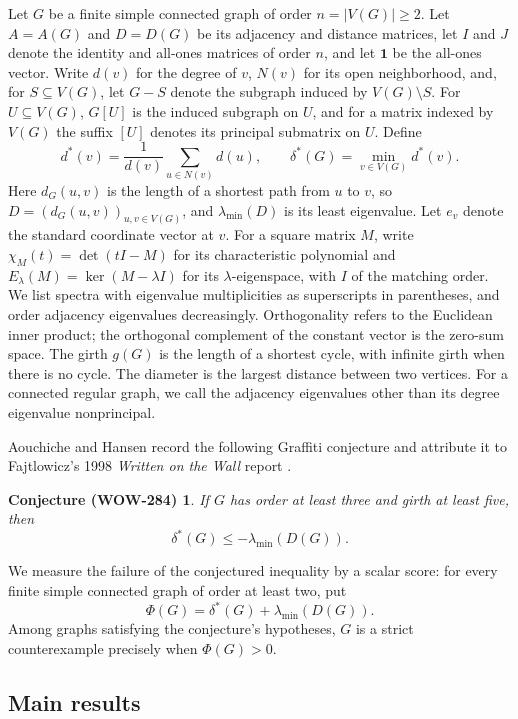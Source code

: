 \documentclass[a4paper,10pt,reqno]{amsart}
\theoremstyle{plain}
\newtheorem*{wowconjecture}{Conjecture (WOW-284)}
\theoremstyle{definition}
\theoremstyle{remark}
\newcommand{\one}{\mathbf 1}
\begin{document}
Let \(G\) be a finite simple connected graph of order
\(n=|V(G)|\ge2\).  Let \(A=A(G)\) and \(D=D(G)\) be its adjacency and
distance matrices, let \(I\) and \(J\) denote the identity and all-ones
matrices of order \(n\), and let \(\one\) be the all-ones vector.  Write
\(d(v)\) for the degree of \(v\), \(N(v)\) for its open neighborhood, and, for
\(S\subseteq V(G)\), let \(G-S\) denote the subgraph induced by
\(V(G)\setminus S\).  For \(U\subseteq V(G)\), \(G[U]\) is the induced
subgraph on \(U\), and for a matrix indexed by \(V(G)\) the suffix \([U]\)
denotes its principal submatrix on \(U\).  Define
\[
 d^*(v)=\frac1{d(v)}\sum_{u\in N(v)}d(u),
 \qquad
 \delta^*(G)=\min_{v\in V(G)}d^*(v).
\]
Here \(d_G(u,v)\) is the length of a shortest path from \(u\) to \(v\),
so \(D=(d_G(u,v))_{u,v\in V(G)}\), and \(\lambda_{\min}(D)\) is its least
eigenvalue.
Let \(e_v\) denote the standard coordinate vector at \(v\). For a square
matrix \(M\), write \(\chi_M(t)=\det(tI-M)\) for its characteristic
polynomial and \(E_\lambda(M)=\ker(M-\lambda I)\) for its
\(\lambda\)-eigenspace, with \(I\) of the matching order. We list spectra with
eigenvalue multiplicities as superscripts in parentheses, and order adjacency
eigenvalues decreasingly. Orthogonality refers to the Euclidean inner product;
the orthogonal complement of the constant vector is the zero-sum space.
The girth \(g(G)\) is the length of a
shortest cycle, with infinite girth when there is no cycle. The diameter is
the largest distance between two vertices. For a connected regular graph, we
call the adjacency eigenvalues other than its degree eigenvalue
nonprincipal.

Aouchiche and Hansen \cite[Conjecture~7.16]{AouchicheHansen2014} record the
following Graffiti conjecture and attribute it to Fajtlowicz's 1998
\emph{Written on the Wall} report \cite{Fajtlowicz1998}.

\begin{wowconjecture}
If \(G\) has order at least three and girth at least five, then
\[
 \delta^*(G)\le-\lambda_{\min}(D(G)).
\]
\end{wowconjecture}

We measure the failure of the conjectured inequality by a scalar score:
for every finite simple connected graph of order at least two, put
\[
 \Phi(G)=\delta^*(G)+\lambda_{\min}(D(G)).
\]
Among graphs satisfying the conjecture's hypotheses, \(G\) is a strict
counterexample precisely when \(\Phi(G)>0\).

\subsection{Main results}
\end{document}
